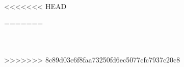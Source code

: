 \documentclass[11pt,a4paper]{article}
\begin{document}
<<<<<<< HEAD
























=======


 \ \\
 \ \\
>>>>>>> 8c89d03c6f8faa73250fd6ec5077cfc7937c20c8
\end{document}

